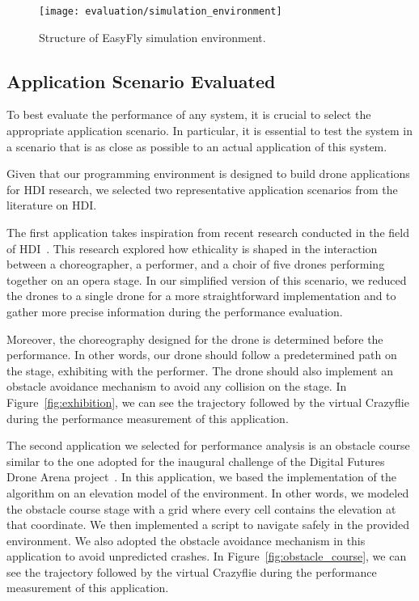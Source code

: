 \begin{figure}[tb]
    \centering
    \texttt{[image: evaluation/simulation\_environment]}
    \caption{Structure of EasyFly simulation environment.}\label{fig:simulation_environment}
\end{figure}


\subsection{Application Scenario Evaluated}\label{subsec:application_scenario_evaluated}
To best evaluate the performance of any system, it is crucial to select the appropriate application scenario.
In particular, it is essential to test the system in a scenario that is as close as possible to an actual application of this system.

Given that our programming environment is designed to build drone applications for HDI research, we selected two representative application scenarios from the literature on HDI.

The first application takes inspiration from recent research conducted in the field of HDI~\cite{eriksson2020ethicsInMovement}. 
This research explored how ethicality is shaped in the interaction between a choreographer, a performer, and a choir of five drones performing together on an opera stage.
In our simplified version of this scenario, we reduced the drones to a single drone for a more straightforward implementation and to gather more precise information during the performance evaluation.

Moreover, the choreography designed for the drone is determined before the performance.
In other words, our drone should follow a predetermined path on the stage, exhibiting with the performer. 
The drone should also implement an obstacle avoidance mechanism to avoid any collision on the stage.
In Figure~\ref{fig:exhibition}, we can see the trajectory followed by the virtual Crazyflie during the performance measurement of this application.

The second application we selected for performance analysis is an obstacle course similar to the one adopted for the inaugural challenge of the Digital Futures Drone Arena project~\cite{dronearenaChallenge}.
In this application, we based the implementation of the algorithm on an elevation model of the environment. 
In other words, we modeled the obstacle course stage with a grid where every cell contains the elevation at that coordinate.
We then implemented a script to navigate safely in the provided environment. 
We also adopted the obstacle avoidance mechanism in this application to avoid unpredicted crashes.
In Figure~\ref{fig:obstacle_course}, we can see the trajectory followed by the virtual Crazyflie during the performance measurement of this application.

